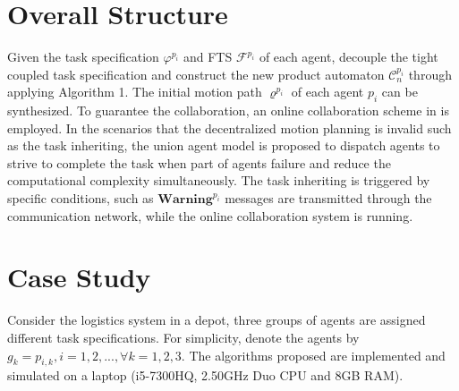 \documentclass[journal]{IEEEtran}
\begin{document}
\section{Overall Structure}
Given the task specification $\varphi^{p_i}$ and FTS $\mathcal{F}^{p_i}$ of each agent, decouple the tight coupled task specification and construct the new product automaton $\mathcal{C}^{p_i}_n$ through applying Algorithm 1. The initial motion path $\varrho^{p_i}$ of each agent $p_i$ can be synthesized. To guarantee the collaboration, an online collaboration scheme in \cite{guo2017task} is employed. In the scenarios that the decentralized motion planning is invalid such as the task inheriting, the union agent model is proposed to dispatch agents to strive to complete the task when part of agents failure and reduce the computational complexity simultaneously. The task inheriting is triggered by specific conditions, such as $\textbf{Warning}^{p_i}$ messages are transmitted through the communication network, while the online collaboration system is running.
\section{Case Study}
Consider the logistics system in a depot, three groups of agents are assigned different task specifications. For simplicity, denote the agents by $g_k={p_{i,k},i=1,2,...},\forall k=1,2,3$. The algorithms proposed are implemented and simulated on a laptop (i5-7300HQ, 2.50GHz Duo CPU and 8GB RAM).
\end{document}
